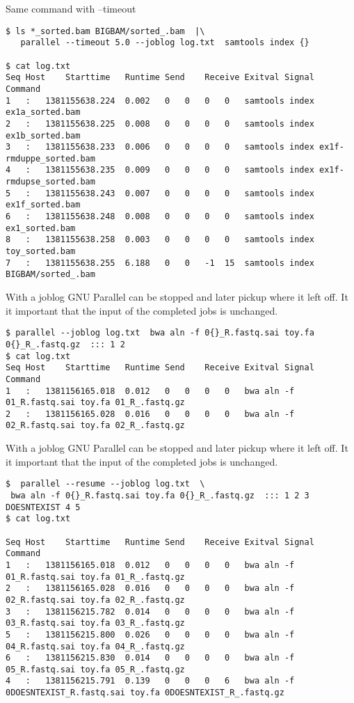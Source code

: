 \documentclass{article}
\begin{document}
Same command with --timeout
\begin{lstlisting}
$ ls *_sorted.bam BIGBAM/sorted_.bam  |\
   parallel --timeout 5.0 --joblog log.txt  samtools index {}

$ cat log.txt
Seq	Host	Starttime	Runtime	Send	Receive	Exitval	Signal	Command
1	:	1381155638.224	0.002	0	0	0	0	samtools index ex1a_sorted.bam
2	:	1381155638.225	0.008	0	0	0	0	samtools index ex1b_sorted.bam
3	:	1381155638.233	0.006	0	0	0	0	samtools index ex1f-rmduppe_sorted.bam
4	:	1381155638.235	0.009	0	0	0	0	samtools index ex1f-rmdupse_sorted.bam
5	:	1381155638.243	0.007	0	0	0	0	samtools index ex1f_sorted.bam
6	:	1381155638.248	0.008	0	0	0	0	samtools index ex1_sorted.bam
8	:	1381155638.258	0.003	0	0	0	0	samtools index toy_sorted.bam
7	:	1381155638.255	6.188	0	0	-1	15	samtools index BIGBAM/sorted_.bam
\end{lstlisting}
With a joblog GNU Parallel can be stopped and later pickup where it left off. It it important that the input of the completed jobs is unchanged.
\begin{lstlisting}
$ parallel --joblog log.txt  bwa aln -f 0{}_R.fastq.sai toy.fa 0{}_R_.fastq.gz  ::: 1 2
$ cat log.txt
Seq	Host	Starttime	Runtime	Send	Receive	Exitval	Signal	Command
1	:	1381156165.018	0.012	0	0	0	0	bwa aln -f 01_R.fastq.sai toy.fa 01_R_.fastq.gz
2	:	1381156165.028	0.016	0	0	0	0	bwa aln -f 02_R.fastq.sai toy.fa 02_R_.fastq.gz
\end{lstlisting}
With a joblog GNU Parallel can be stopped and later pickup where it left off. It it important that the input of the completed jobs is unchanged.
\begin{lstlisting}
$  parallel --resume --joblog log.txt  \
 bwa aln -f 0{}_R.fastq.sai toy.fa 0{}_R_.fastq.gz  ::: 1 2 3 DOESNTEXIST 4 5
$ cat log.txt

Seq	Host	Starttime	Runtime	Send	Receive	Exitval	Signal	Command
1	:	1381156165.018	0.012	0	0	0	0	bwa aln -f 01_R.fastq.sai toy.fa 01_R_.fastq.gz
2	:	1381156165.028	0.016	0	0	0	0	bwa aln -f 02_R.fastq.sai toy.fa 02_R_.fastq.gz
3	:	1381156215.782	0.014	0	0	0	0	bwa aln -f 03_R.fastq.sai toy.fa 03_R_.fastq.gz
5	:	1381156215.800	0.026	0	0	0	0	bwa aln -f 04_R.fastq.sai toy.fa 04_R_.fastq.gz
6	:	1381156215.830	0.014	0	0	0	0	bwa aln -f 05_R.fastq.sai toy.fa 05_R_.fastq.gz
4	:	1381156215.791	0.139	0	0	0	6	bwa aln -f 0DOESNTEXIST_R.fastq.sai toy.fa 0DOESNTEXIST_R_.fastq.gz
\end{lstlisting}
\end{document}
